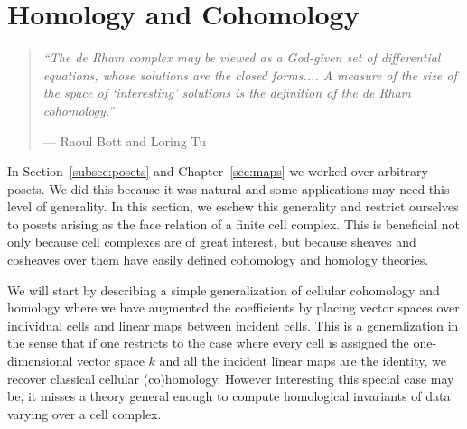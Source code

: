
%
%

\chapter{Homology and Cohomology}
\label{sec:homology}

\begin{quote}
{\em``The de Rham complex may be viewed as a God-given set of differential equations, whose solutions are the closed forms.... A measure of the size of the space of `interesting' solutions is the definition of the de Rham cohomology.''}
\begin{flushright} --- Raoul Bott and Loring Tu~\cite[p. 15]{bott1982differential} \end{flushright}
\end{quote}

In Section~\ref{subsec:posets} and Chapter~\ref{sec:maps} we worked over arbitrary posets. We did this because it was natural and some applications may need this level of generality. In this section, we eschew this generality and restrict ourselves to posets arising as the face relation of a finite cell complex. This is beneficial not only because cell complexes are of great interest, but because sheaves and cosheaves over them have easily defined cohomology and homology theories.

We will start by describing a simple generalization of cellular cohomology and homology where we have augmented the coefficients by placing vector spaces over individual cells and linear maps between incident cells. This is a generalization in the sense that if one restricts to the case where every cell is assigned the one-dimensional vector space $k$ and all the incident linear maps are the identity, we recover classical cellular (co)homology. However interesting this special case may be, it misses a theory general enough to compute homological invariants of data varying over a cell complex.

